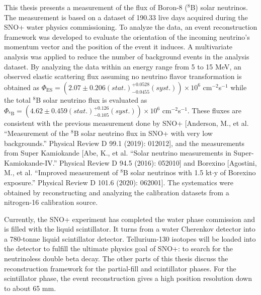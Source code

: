 \begin{doublespacing}
This thesis presents a measurement of the flux of Boron-8 ($^8$B) solar neutrinos. The measurement is based on a dataset of 190.33 live days acquired during the SNO+ water physics commissioning. To analyze the data, an event reconstruction framework was developed to evaluate the orientation of the incoming neutrino's momentum vector and the position of the event it induces. A multivariate analysis was applied to reduce the number of background events in the analysis dataset. By analyzing the data within an energy range from 5 to 15 MeV, an observed elastic scattering flux assuming no neutrino flavor transformation is obtained as $\Phi_{\mathrm{ES}}=(2.07 \pm 0.206 (stat.)^{+0.0528}_{-0.0455}(syst.))\times10^6$ cm$^{-2}$s$^{-1}$ while the total $^8$B solar neutrino flux is evaluated as $\Phi_{\mathrm{^8B}}=(4.62 \pm 0.459 (stat.)^{+0.126}_{-0.105}(syst.))\times10^6$ cm$^{-2}$s$^{-1}$. These fluxes are consistent with the previous measurement done by SNO+ [Anderson, M., et al. ``Measurement of the $^8$B solar neutrino flux in SNO+ with very low backgrounds.'' Physical Review D 99.1 (2019): 012012], and the measurements from Super Kamiokande [Abe, K., et al. ``Solar neutrino measurements in Super-Kamiokande-IV.'' Physical Review D 94.5 (2016): 052010] and Borexino [Agostini, M., et al. ``Improved measurement of $^8$B solar neutrinos with 1.5 kt$\cdot$y of Borexino exposure.'' Physical Review D 101.6 (2020): 062001]. The systematics were obtained by reconstructing and analyzing the calibration datasets from a nitrogen-16 calibration source.

Currently, the SNO+ experiment has completed the water phase commission and is filled with the liquid scintillator. It turns from a water Cherenkov detector into a 780-tonne liquid scintillator detector. Tellurium-130 isotopes will be loaded into the detector to fulfill the ultimate physics goal of SNO+: to search for the neutrinoless double beta decay. The other parts of this thesis discuss the reconstruction framework for the partial-fill and scintillator phases. For the scintillator phase, the event reconstruction gives a high position resolution down to about 65 mm.


\end{doublespacing}